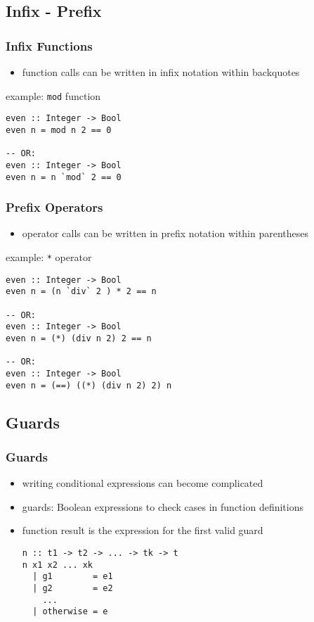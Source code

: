 \documentclass[dvipsnames]{beamer}
\theoremstyle{plain}
\begin{document}
\subsection{Infix - Prefix}

\begin{frame}[fragile]
  \frametitle{Infix Functions}

  \begin{itemize}
    \item function calls can be written in infix notation within backquotes
  \end{itemize}

  \begin{exampleblock}{example: \lstinline{mod} function}
    \begin{lstlisting}
even :: Integer -> Bool
even n = mod n 2 == 0

-- OR:
even :: Integer -> Bool
even n = n `mod` 2 == 0
    \end{lstlisting}
  \end{exampleblock}
\end{frame}

\begin{frame}[fragile]
  \frametitle{Prefix Operators}

  \begin{itemize}
    \item operator calls can be written in prefix notation within parentheses
  \end{itemize}

  \begin{exampleblock}{example: \lstinline{*} operator}
    \begin{lstlisting}
even :: Integer -> Bool
even n = (n `div` 2 ) * 2 == n

-- OR:
even :: Integer -> Bool
even n = (*) (div n 2) 2 == n

-- OR:
even :: Integer -> Bool
even n = (==) ((*) (div n 2) 2) n
    \end{lstlisting}
  \end{exampleblock}
\end{frame}

\subsection{Guards}

\begin{frame}[fragile]
  \frametitle{Guards}

  \begin{itemize}
    \item writing conditional expressions can become complicated
    \item \alert{guards}: Boolean expressions to check cases
      in function definitions
    \item function result is the expression for the first valid guard

    \medskip
    \begin{lstlisting}
n :: t1 -> t2 -> ... -> tk -> t
n x1 x2 ... xk
  | g1        = e1
  | g2        = e2
    ...
  | otherwise = e
    \end{lstlisting}
  \end{itemize}
\end{frame}
\end{document}
